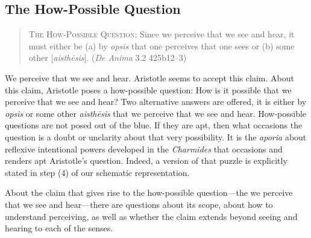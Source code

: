 


\subsection{The How-Possible Question} %
\label{sub:the_how_possible_question}

\begin{quote}
	\textsc{The How-Possible Question}: Since we perceive that we see and hear, it must either be (a) by \emph{opsis} that one perceives that one sees or (b) some other [\emph{aisthēsis}]. (\emph{De Anima} 3.2 425b12–3)
\end{quote}

We perceive that we see and hear. Aristotle seems to accept this claim. About this claim, Aristotle poses a how-possible question: How is it possible that we perceive that we see and hear? Two alternative answers are offered, it is either by \emph{opsis} or some other \emph{aisthēsis} that we perceive that we see and hear. How-possible questions are not posed out of the blue. If they are apt, then what occasions the question is a doubt or unclarity about that very possibility. It is the \emph{aporia} about reflexive intentional powers developed in the \emph{Charmides} that occasions and renders apt Aristotle's question. Indeed, a version of that puzzle is explicitly stated in step (4) of our schematic representation.

About the claim that gives rise to the how-possible question—the we perceive that we see and hear—there are questions about its scope, about how to understand perceiving, as well as whether the claim extends beyond seeing and hearing to each of the senses.

